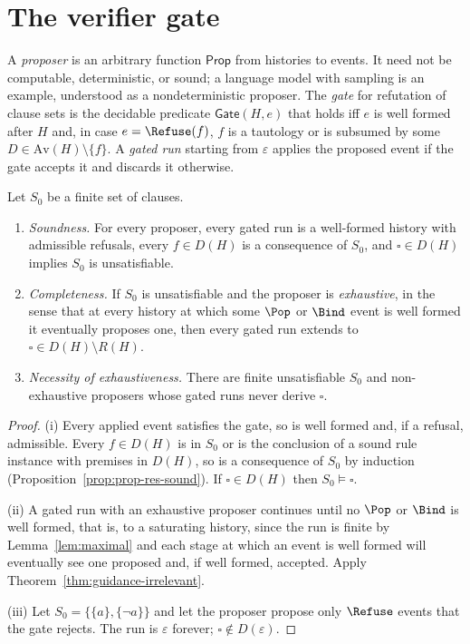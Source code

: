 \section{The verifier gate}
\label{sec:gate}

\begin{definition}
\label{def:gate}
A \emph{proposer} is an arbitrary function $\mathsf{Prop}$ from histories to events. It need not be computable, deterministic, or sound; a language model with sampling is an example, understood as a nondeterministic proposer. The \emph{gate} for refutation of clause sets is the decidable predicate $\mathsf{Gate}(H,e)$ that holds iff $e$ is well formed after $H$ and, in case $e=\Refuse(f)$, $f$ is a tautology or is subsumed by some $D\in\mathrm{Av}(H)\setminus\{f\}$. A \emph{gated run} starting from $\varepsilon$ applies the proposed event if the gate accepts it and discards it otherwise.
\end{definition}

\begin{theorem}
\label{thm:gate}
Let $S_0$ be a finite set of clauses.
\begin{enumerate}[label=(\roman*),nosep]
\item \emph{Soundness.} For every proposer, every gated run is a well-formed history with admissible refusals, every $f\in D(H)$ is a consequence of $S_0$, and $\square\in D(H)$ implies $S_0$ is unsatisfiable.
\item \emph{Completeness.} If $S_0$ is unsatisfiable and the proposer is \emph{exhaustive}, in the sense that at every history at which some $\Pop$ or $\Bind$ event is well formed it eventually proposes one, then every gated run extends to $\square\in D(H)\setminus R(H)$.
\item \emph{Necessity of exhaustiveness.} There are finite unsatisfiable $S_0$ and non-exhaustive proposers whose gated runs never derive $\square$.
\end{enumerate}
\end{theorem}

\begin{proof}
(i) Every applied event satisfies the gate, so is well formed and, if a refusal, admissible. Every $f\in D(H)$ is in $S_0$ or is the conclusion of a sound rule instance with premises in $D(H)$, so is a consequence of $S_0$ by induction (Proposition~\ref{prop:prop-res-sound}). If $\square\in D(H)$ then $S_0\models\square$.

(ii) A gated run with an exhaustive proposer continues until no $\Pop$ or $\Bind$ is well formed, that is, to a saturating history, since the run is finite by Lemma~\ref{lem:maximal} and each stage at which an event is well formed will eventually see one proposed and, if well formed, accepted. Apply Theorem~\ref{thm:guidance-irrelevant}.

(iii) Let $S_0=\{\{a\},\{\neg a\}\}$ and let the proposer propose only $\Refuse$ events that the gate rejects. The run is $\varepsilon$ forever; $\square\notin D(\varepsilon)$.
\end{proof}

